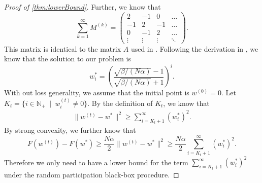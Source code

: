 \begin{proof}[Proof of \autoref{thm:lowerBound}]
    Further, we know that
    \[
        \sum_{k=1}^{\infty} M^{(k)} = \begin{pmatrix}
            2 & -1 & 0 & \dots \\
            -1 & 2 & -1 & \dots \\
            0 & -1 & 2 & \dots \\
            \vdots & \vdots & \vdots & \ddots 
        \end{pmatrix}.
    \]
    This matrix is identical to the matrix $A$ used in \citet[Theorem~3.15]{Bubeck15}. Following the derivation in \citet[Theorem~3.15]{Bubeck15}, we know that the solution to our problem is 
    \[
        w^*_i = \left( \frac{\sqrt{ \beta/(N \alpha) } - 1}{ \sqrt{ \beta/(N \alpha) } + 1 }  \right)^i.
    \]
    With out loss generality, we assume that the initial point is $w^{(0)} = 0$. Let $K_t = \{ i \in \mathbb{N}_+ ~\mid~ w^{(t)}_i \neq 0 \}$. By the definition of $K_t$, we know that
    \begin{align}
        \| w^{(t)} - w^* \|^2 \geq \sum_{i= K_t+1}^{\infty} ( w^*_i )^2.  \label{eq:lowerBoundReminder}
    \end{align}
    By strong convexity, we further know that
    \[
        F(w^{(t)}) - F(w^*) \geq \frac{ N \alpha }{2} \| w^{(t)} - w^* \|^2 \geq \frac{ N \alpha }{2} \sum_{i= K_t+1}^{\infty} ( w^*_i )^2.
    \]
    Therefore we only need to have a lower bound for the term $\sum_{i= K_t+1}^{\infty} ( w^*_i )^2$ under the random participation black-box procedure.
    

\end{proof}
